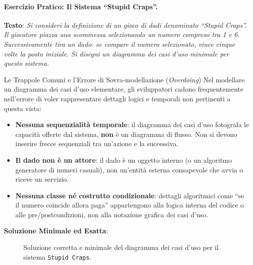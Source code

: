 \documentclass[12pt]{extarticle}
\newcommand{\actor}[4]{\begin{scope}[shift={(#2,#3)}]
  \node[circle,draw,semithick,minimum size=0.4cm,inner sep=0] at (0,0.55) {};
  \draw[semithick] (0,0.35)--(0,-0.2) (-0.3,0.15)--(0.3,0.15) (0,-0.2)--(-0.25,-0.7) (0,-0.2)--(0.25,-0.7);
  \node[minimum width=0.8cm,minimum height=1.4cm] (#1) at (0,0) {};
  \node[font=\footnotesize\sffamily,anchor=north,align=center] at (0,-0.75) {#4};
\end{scope}}
\begin{document}
\paragraph{Esercizio Pratico: Il Sistema ``Stupid Craps''.}
\textbf{Testo}: \textit{Si consideri la definizione di un gioco di dadi denominato ``Stupid Craps''. Il giocatore piazza una scommessa selezionando un numero compreso tra 1 e 6. Successivamente tira un dado: se compare il numero selezionato, vince cinque volte la posta iniziale. Si disegni un diagramma dei casi d'uso minimale per questo sistema.}

\begin{cbox}{Le Trappole Comuni e l'Errore di Sovra-modellazione (\textit{Overdoing})}
\noindent Nel modellare un diagramma dei casi d'uso elementare, gli sviluppatori cadono frequentemente nell'errore di voler rappresentare dettagli logici e temporali non pertinenti a questa vista:
\begin{itemize}
    \item \textbf{Nessuna sequenzialità temporale}: il diagramma dei casi d'uso fotografa le capacità offerte dal sistema, \textbf{non} è un diagramma di flusso. Non si devono inserire frecce sequenziali tra un'azione e la successiva.
    \item \textbf{Il dado non è un attore}: il dado è un oggetto interno (o un algoritmo generatore di numeri casuali), non un'entità esterna consapevole che avvia o riceve un servizio.
    \item \textbf{Nessuna classe né costrutto condizionale}: dettagli algoritmici come ``se il numero coincide allora paga'' appartengono alla logica interna del codice o alle pre/postcondizioni, non alla notazione grafica dei casi d'uso.
\end{itemize}
\end{cbox}

\noindent \textbf{Soluzione Minimale ed Esatta}:

\begin{figure}[H]
    \centering
{}
    \caption{Soluzione corretta e minimale del diagramma dei casi d'uso per il sistema \texttt{Stupid Craps}.}
    \label{fig:uml_stupid_craps_solution}
\end{figure}
\end{document}
